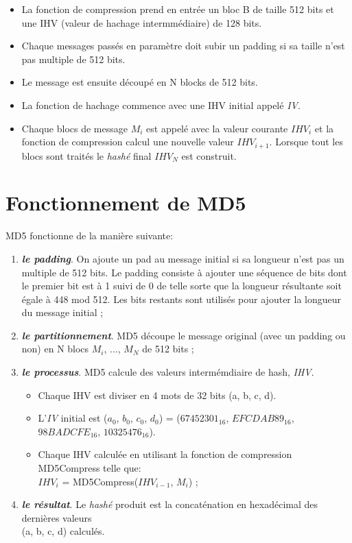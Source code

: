 \documentclass[a4paper,11pt,french]{article}
\begin{document}
\begin{itemize}
\item La fonction de compression prend en entrée un bloc B de taille 512 bits et une IHV (valeur de hachage intermmédiaire) de 128 bits.
\item Chaque messages passés en paramètre doit subir un padding si sa taille n'est pas multiple de 512 bits.
\item Le message est ensuite découpé en N blocks de 512 bits.
\item La fonction de hachage commence avec une IHV initial appelé {\it{IV}}.
\item Chaque blocs de message $M_{i}$ est appelé avec la valeur courante $IHV_{i}$ et la fonction de compression calcul une nouvelle valeur $IHV_{i+1}$. Lorsque tout les blocs sont traités le {\it{hashé}} final $IHV_{N}$ est construit.
\end{itemize}
\vspace{.5cm}

\section{Fonctionnement de MD5}
MD5 fonctionne de la manière suivante:\\
\begin{enumerate}
\item {\it{\bf{le padding}}}. On ajoute un pad au message initial si sa longueur n'est pas un multiple de 512 bits. Le padding consiste à ajouter une séquence de bits dont le premier bit est à 1 suivi de 0 de telle sorte que la longueur résultante soit égale à 448 mod 512. Les bits restants sont utilisés pour ajouter la longueur du message initial ;
\item {\it{\bf{le partitionnement}}}. MD5 découpe le message original (avec un padding ou non) en N blocs $M_{i}$, ..., $M_{N}$ de 512 bits ;
\item {\it{\bf{le processus}}}. MD5 calcule des valeurs intermémdiaire de hash, {\it{IHV}}.
  \begin{itemize}
  \item Chaque IHV est diviser en 4 mots de 32 bits (a, b, c, d).
  \item L'{\it{IV}} initial est ($a_{0}$, $b_{0}$, $c_{0}$, $d_{0}$) = ($67452301_{16}$, $EFCDAB89_{16}$, $98BADCFE_{16}$, $10325476_{16}$).
  \item Chaque IHV calculée en utilisant la fonction de compression MD5Compress telle que:\\ $IHV_{i}$ = MD5Compress($IHV_{i-1}$, $M_{i}$) ;
  \end{itemize}
\item {\it{\bf{le résultat}}}. Le {\it{hashé}} produit est la concaténation en hexadécimal des dernières valeurs\\ (a, b, c, d) calculés.
\end{enumerate}
\end{document}
